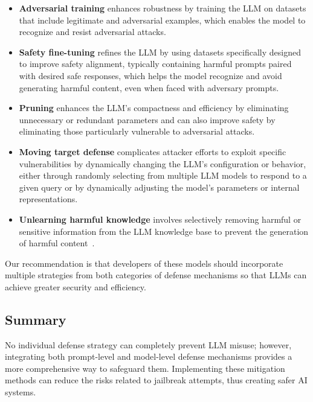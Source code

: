 \begin{itemize}
    \item \textbf{Adversarial training} enhances robustness by training the LLM on datasets that include legitimate and adversarial examples, which enables the model to recognize and resist adversarial attacks.
    \item \textbf{Safety fine-tuning} refines the LLM by using datasets specifically designed to improve safety alignment, typically containing harmful prompts paired with desired safe responses, which helps the model recognize and avoid generating harmful content, even when faced with adversary prompts.
    \item \textbf{Pruning} enhances the LLM's compactness and efficiency by eliminating unnecessary or redundant parameters and can also improve safety by eliminating those particularly vulnerable to adversarial attacks.
    \item \textbf{Moving target defense} complicates attacker efforts to exploit specific vulnerabilities by dynamically changing the LLM's configuration or behavior, either through randomly selecting from multiple LLM models to respond to a given query or by dynamically adjusting the model's parameters or internal representations.
    \item \textbf{Unlearning harmful knowledge} involves selectively removing harmful or sensitive information from the LLM knowledge base to prevent the generation of harmful content~\cite{lu2024eraserjailbreakingdefenselarge}.
\end{itemize}

Our recommendation is that developers of these models should incorporate multiple strategies from both categories of defense mechanisms so that LLMs can achieve greater security and efficiency.

\subsection*{Summary}

No individual defense strategy can completely prevent LLM misuse; however, integrating both prompt-level and model-level defense mechanisms provides a more comprehensive way to safeguard them. Implementing these mitigation methods can reduce the risks related to jailbreak attempts, thus creating safer AI systems.
